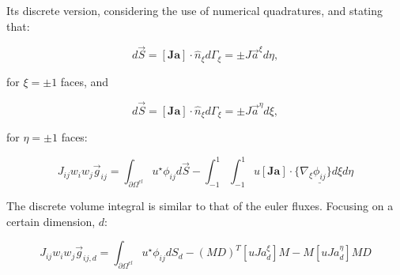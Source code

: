 \documentclass[10pt,a4paper]{article}
\begin{document}
Its discrete version, considering the use of numerical quadratures, and stating that:

\begin{equation}
d\vec{S} = 	[\boldsymbol{Ja}]\cdot \hat{n}_\xi d\Gamma_\xi = \pm J\vec{a}^\xi d\eta,
\end{equation}

for $\xi = \pm 1$ faces, and 

\begin{equation}
	d\vec{S} = [\boldsymbol{Ja}]\cdot \hat{n}_\xi d\Gamma_\xi = \pm J\vec{a}^\eta d\xi,
\end{equation}

for $\eta = \pm 1$ faces:

\begin{equation}
	J_{ij}w_iw_j \vec{g}_{ij} = \int_{\partial \Omega^{el}}u^\star \phi_{ij} d\vec{S} -\int_{-1}^{1}\int_{-1}^{1} u [\boldsymbol{Ja}] \cdot \{\nabla_\xi \underline{\phi_{ij}}\}d\xi d\eta	
\end{equation}

The discrete volume integral is similar to that of the euler fluxes. Focusing on a certain dimension, $d$:

\begin{equation}
	J_{ij}w_iw_j \vec{g}_{ij,d} = \int_{\partial \Omega^{el}}u^\star \phi_{ij} dS_d - (MD)^T[uJa^\xi_d]M - M[uJa^\eta_d]MD
\end{equation}
\end{document}
